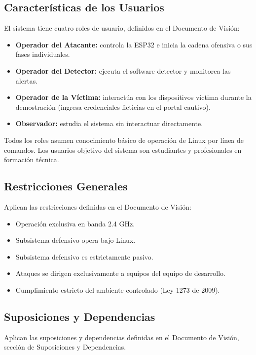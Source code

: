 \documentclass[11pt,a4paper]{article}
\begin{document}
\subsection{Características de los Usuarios}
El sistema tiene cuatro roles de usuario, definidos en el Documento de
Visión:

\begin{itemize}
  \item \textbf{Operador del Atacante:} controla la ESP32 e inicia la
    cadena ofensiva o sus fases individuales.
  \item \textbf{Operador del Detector:} ejecuta el software detector y
    monitorea las alertas.
  \item \textbf{Operador de la Víctima:} interactúa con los dispositivos
    víctima durante la demostración (ingresa credenciales ficticias en
    el portal cautivo).
  \item \textbf{Observador:} estudia el sistema sin interactuar
    directamente.
\end{itemize}

Todos los roles asumen conocimiento básico de operación de Linux por
línea de comandos. Los usuarios objetivo del sistema son estudiantes y
profesionales en formación técnica.

\subsection{Restricciones Generales}
Aplican las restricciones definidas en el Documento de Visión:

\begin{itemize}
  \item Operación exclusiva en banda 2.4 GHz.
  \item Subsistema defensivo opera bajo Linux.
  \item Subsistema defensivo es estrictamente pasivo.
  \item Ataques se dirigen exclusivamente a equipos del equipo de
    desarrollo.
  \item Cumplimiento estricto del ambiente controlado (Ley 1273 de 2009).
\end{itemize}

\subsection{Suposiciones y Dependencias}
Aplican las suposiciones y dependencias definidas en el Documento de
Visión, sección de Suposiciones y Dependencias.
\end{document}
